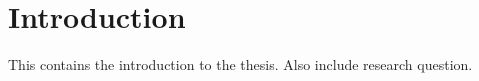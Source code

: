 \section{Introduction}
This contains the introduction to the thesis.
Also include research question.

\lipsum[1]
